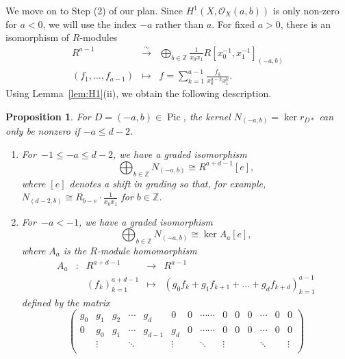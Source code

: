 \documentclass[a4paper,11pt]{amsart}
\theoremstyle{plain}
\newtheorem{proposition}[theorem]{Proposition}
\theoremstyle{definition}
\newcommand{\Z}{\mathbb{Z}}
\newcommand{\Ox}{\mathcal{O}}
\DeclareMathOperator{\Pic}{Pic}
\begin{document}
We move on to Step (2) of our plan. Since $H^1(X,\Ox_X(a,b))$ is only non-zero for $a<0$, we will use the index $-a$ rather than $a$. For fixed $a > 0$, there is an isomorphism of $R$-modules
\begin{equation}\label{eq:isodirectsum} \begin{array}{rcl}R^{a-1}& \stackrel{\sim}\longrightarrow& \displaystyle\bigoplus_{b \in \Z} 
\frac{1}{x_0 x_1}R[x_0^{-1},x_1^{-1}]_{(-a,b)} \\
(f_1, \ldots, f_{a-1}) & \mapsto & f=\displaystyle\sum_{k=1}^{a-1} \frac{f_k}{x_0^{a-k} x_1^k}.
\end{array}\end{equation}
Using Lemma~\ref{lem:H1}(ii), we obtain the following description. 
\begin{proposition}\label{prop:ker} For $D=(-a,b)\in\Pic$, the kernel $N_{(-a,b)}=\ker r_{D*}$ can only be nonzero if $-a \leq d-2$. 
\begin{enumerate}\item[(i)]
For~$-1 \leq -a \leq d-2$, we have a graded isomorphism
\begin{equation*}
    \bigoplus_{b \in \Z} N_{(-a,b)} \cong R^{a+d-1}[e], 
\end{equation*}
where $[e]$ denotes a shift in grading so that, for example, 
$N_{(d-2,b)} \cong R_{b-e} \cdot \frac{1}{x_0 x_1}$
for $b \in \Z$. 
\item[(ii)]
For~$-a<-1$, we have a graded isomorphism
\begin{equation*}
    \bigoplus_{b \in \Z} N_{(-a,b)} \cong \ker A_a[e],
\end{equation*}
where $A_a$ is the $R$-module homomorphism
\[
\begin{array}{rcccl}
  A_a & \colon & R^{a+d-1} & \longrightarrow & R^{a-1} 
  \\  && (f_k)_{k=1}^{a+d-1} & \longmapsto &  (g_0 f_{k} + g_1 f_{k+1} + \ldots + g_d f_{k+d})_{k=1}^{a-1}
\end{array}
\]
defined by the matrix
\begin{equation*}
         \begin{pmatrix}
            g_0 & g_1 & g_2 & \cdots & g_d & 0 & 0 & \cdots \cdots & 0 & 0 & 0 & \cdots & 0 & 0\\
            0 & g_0 & g_1 & \cdots & g_{d-1} & g_d & 0 & \cdots \cdots & 0 & 0 & 0 & \cdots & 0 & 0\\
            \ & \vdots & \ & \ddots & \ & \vdots & \ & \ddots & \vdots & \ & \ & \ddots & \ & \vdots\\

\end{pmatrix}
\end{equation*}
\end{enumerate}
\end{proposition}
\end{document}
